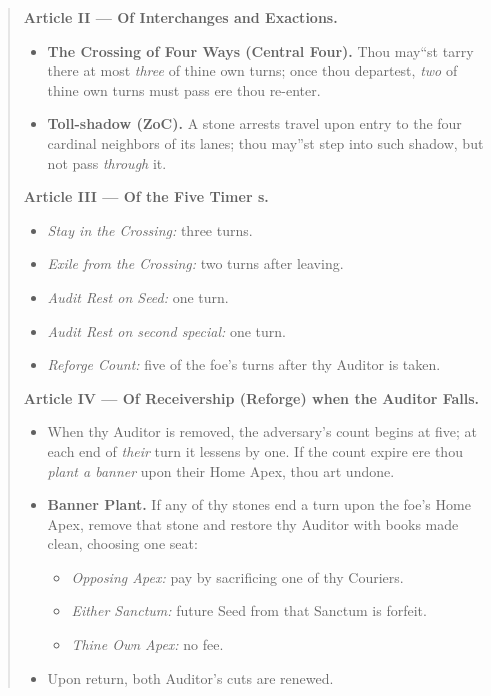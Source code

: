 \documentclass[11pt]{article}
\begin{document}
\begin{quote}
\textbf{Article II --- Of Interchanges and Exactions.}
\begin{itemize}\itemsep0.25em
  \item \textbf{The Crossing of Four Ways (Central Four).} Thou may``st tarry there at most \emph{three} of thine own turns; once thou departest, \emph{two} of thine own turns must pass ere thou re-enter.
  \item \textbf{Toll-shadow (ZoC).} A stone arrests travel upon entry to the four cardinal neighbors of its lanes; thou may''st step into such shadow, but not pass \emph{through} it.
\end{itemize}

\textbf{Article III --- Of the Five Timer s.}
\begin{itemize}\itemsep0.25em
  \item \emph{Stay in the Crossing:} three turns.
  \item \emph{Exile from the Crossing:} two turns after leaving.
  \item \emph{Audit Rest on Seed:} one turn.
  \item \emph{Audit Rest on second special:} one turn.
  \item \emph{Reforge Count:} five of the foe's turns after thy Auditor is taken.
\end{itemize}

\textbf{Article IV --- Of Receivership (Reforge) when the Auditor Falls.}
\begin{itemize}\itemsep0.25em
  \item When thy Auditor is removed, the adversary's count begins at five; at each end of \emph{their} turn it lessens by one. If the count expire ere thou \emph{plant a banner} upon their Home Apex, thou art undone.
  \item \textbf{Banner Plant.} If any of thy stones end a turn upon the foe's Home Apex, remove that stone and restore thy Auditor with books made clean, choosing one seat:
    \begin{itemize}\itemsep0.15em
      \item \emph{Opposing Apex:} pay by sacrificing one of thy Couriers.
      \item \emph{Either Sanctum:} future Seed from that Sanctum is forfeit.
      \item \emph{Thine Own Apex:} no fee.
    \end{itemize}
  \item Upon return, both Auditor's cuts are renewed.
\end{itemize}


\end{quote}
\end{document}
